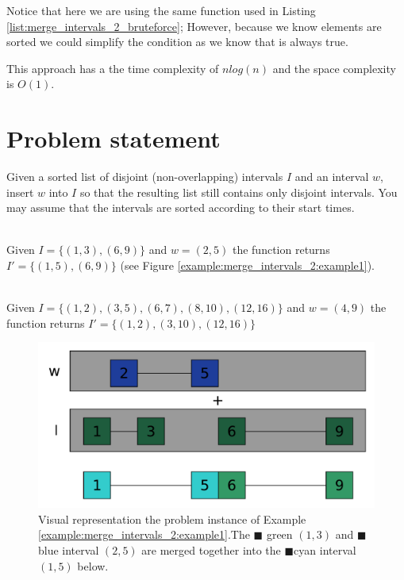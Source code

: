 Notice that here we are using the same  function used in Listing \ref{list:merge_intervals_2_bruteforce}; However, because we know elements are sorted we could simplify the condition  as we know that  is always true.

This approach has a the time complexity of $nlog(n)$ and the space complexity is $O(1)$.

\section{Problem statement}
\begin{exercise}
\label{example:merge_intervals_2:exercice1_2}

Given a sorted list of disjoint (non-overlapping) intervals $I$ and an interval $w$, insert $w$ into $I$ so that the resulting list still contains only disjoint intervals.
You may assume that the intervals are sorted according to their start times.

	\begin{example}
		\label{example:merge_intervals_2:example1}
		\hfill \\
		Given $I=\{(1,3),(6,9)\}$ and $w=(2,5)$ the function returns $I'=\{(1,5),(6,9)\}$ (see Figure \ref{example:merge_intervals_2:example1}).
	\end{example}

	\begin{example}
		\label{example:merge_intervals_2:example2}
		\hfill \\
		Given $I=\{(1,2),(3,5),(6,7),(8,10),(12,16)\}$ and $w=(4,9)$ the function returns $I'=\{(1,2),(3,10),(12,16)\}$
	\end{example}

\end{exercise}

\begin{figure}
	\centering
	\includegraphics[width=\textwidth]{sources/merge_intervals_2/images/example1}
	\caption[Implicit graph for the Example \ref{example:merge_intervals_2:example1}.]
	{Visual representation the problem instance of Example
	\ref{example:merge_intervals_2:example1}.The \textcolor[HTML]{339966}{$\blacksquare$} green $(1,3)$ and \textcolor[HTML]{3366ff}{$\blacksquare$} blue interval $(2,5)$  are merged together into the \textcolor[HTML]{33cccc}{$\blacksquare$}cyan interval $(1,5)$ below.}
	\label{fig:merge_intervals_2:example1}
\end{figure}


